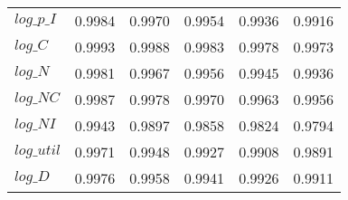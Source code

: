 \begin{center}
\begin{longtable}{lccccc}
$log\_p\_I  $	 & 	     0.9984	 & 	     0.9970	 & 	     0.9954	 & 	     0.9936	 & 	     0.9916 \\ 
$log\_C     $	 & 	     0.9993	 & 	     0.9988	 & 	     0.9983	 & 	     0.9978	 & 	     0.9973 \\ 
$log\_N     $	 & 	     0.9981	 & 	     0.9967	 & 	     0.9956	 & 	     0.9945	 & 	     0.9936 \\ 
$log\_NC    $	 & 	     0.9987	 & 	     0.9978	 & 	     0.9970	 & 	     0.9963	 & 	     0.9956 \\ 
$log\_NI    $	 & 	     0.9943	 & 	     0.9897	 & 	     0.9858	 & 	     0.9824	 & 	     0.9794 \\ 
$log\_util  $	 & 	     0.9971	 & 	     0.9948	 & 	     0.9927	 & 	     0.9908	 & 	     0.9891 \\ 
$log\_D     $	 & 	     0.9976	 & 	     0.9958	 & 	     0.9941	 & 	     0.9926	 & 	     0.9911 \\ 
\end{longtable}
 \end{center}

